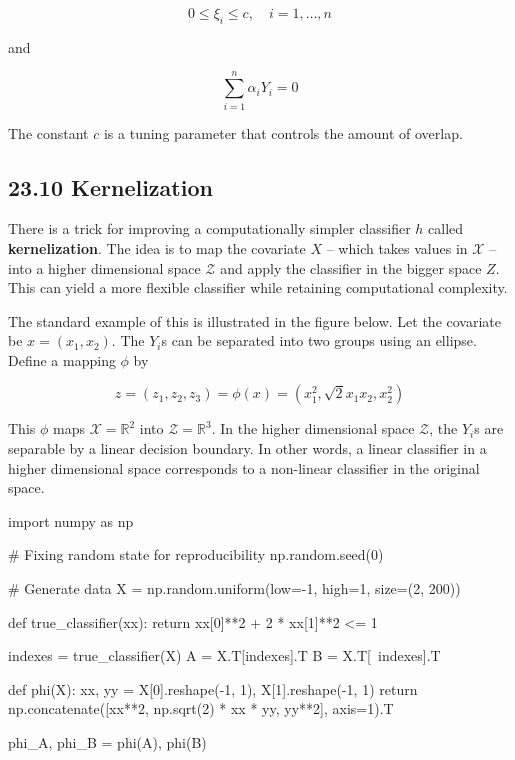 \[ 0 \leq \xi_{i} \leq c, \quad i = 1, \dots, n \]

and

\[ \sum_{i=1}^{n} \alpha_{i} Y_{i} = 0 \]

The constant \(c\) is a tuning parameter that controls the amount of
overlap.

\subsection*{23.10 Kernelization}\label{kernelization}

There is a trick for improving a computationally simpler classifier
\(h\) called \textbf{kernelization}. The idea is to map the covariate
\(X\) -- which takes values in \(\mathcal{X}\) -- into a higher
dimensional space \(\mathcal{Z}\) and apply the classifier in the bigger
space \(Z\). This can yield a more flexible classifier while retaining
computational complexity.

The standard example of this is illustrated in the figure below. Let the
covariate be \(x = (x_{1}, x_{2})\). The \(Y_{i}\)s can be separated into two
groups using an ellipse. Define a mapping \(\phi\) by

\[ z = (z_{1}, z_{2}, z_{3}) = \phi(x) = (x_{1}^{2}, \sqrt{2} x_{1} x_{2}, x_{2}^{2}) \]

This \(\phi\) maps \(\mathcal{X} = \mathbb{R}^{2}\) into
\(\mathcal{Z} = \mathbb{R}^{3}\). In the higher dimensional space
\(\mathcal{Z}\), the \(Y_{i}\)s are separable by a linear decision
boundary. In other words, a linear classifier in a higher dimensional
space corresponds to a non-linear classifier in the original space.

\begin{python}
import numpy as np


# Fixing random state for reproducibility
np.random.seed(0)

# Generate data
X = np.random.uniform(low=-1, high=1, size=(2, 200))

def true_classifier(xx):
    return xx[0]**2 + 2 * xx[1]**2 <= 1

indexes = true_classifier(X)
A = X.T[indexes].T
B = X.T[~indexes].T

def phi(X):
    xx, yy = X[0].reshape(-1, 1), X[1].reshape(-1, 1)
    return np.concatenate([xx**2, np.sqrt(2) * xx * yy, yy**2], axis=1).T

phi_A, phi_B = phi(A), phi(B)
\end{python}

